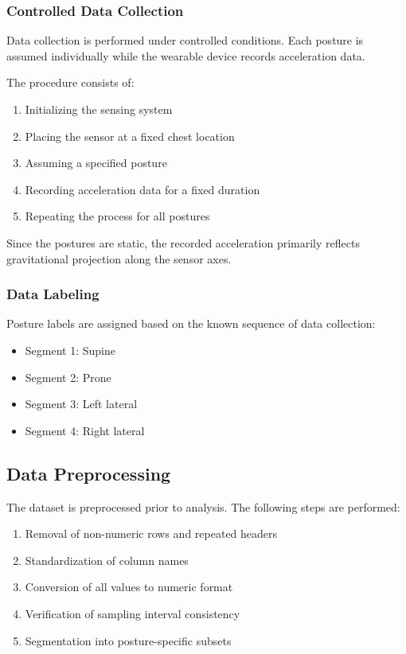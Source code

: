 \documentclass[conference]{IEEEtran}
\begin{document}
\subsubsection{Controlled Data Collection}

Data collection is performed under controlled conditions. Each posture is assumed individually while the wearable device records acceleration data.

The procedure consists of:
\begin{enumerate}
    \item Initializing the sensing system
    \item Placing the sensor at a fixed chest location
    \item Assuming a specified posture
    \item Recording acceleration data for a fixed duration
    \item Repeating the process for all postures
\end{enumerate}

Since the postures are static, the recorded acceleration primarily reflects gravitational projection along the sensor axes.

\subsubsection{Data Labeling}

Posture labels are assigned based on the known sequence of data collection:
\begin{itemize}
    \item Segment 1: Supine
    \item Segment 2: Prone
    \item Segment 3: Left lateral
    \item Segment 4: Right lateral
\end{itemize}

\subsection{Data Preprocessing}

The dataset is preprocessed prior to analysis. The following steps are performed:
\begin{enumerate}
    \item Removal of non-numeric rows and repeated headers
    \item Standardization of column names
    \item Conversion of all values to numeric format
    \item Verification of sampling interval consistency
    \item Segmentation into posture-specific subsets
\end{enumerate}
\end{document}
